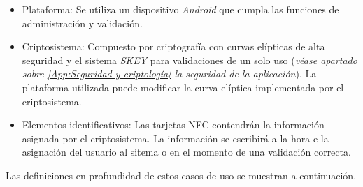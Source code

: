\documentclass[../PFC.tex]{subfiles}
\begin{document}
\begin{itemize}
\item{Plataforma: Se utiliza un dispositivo \textit{Android} que cumpla las funciones de administración y validación.}
\item{Criptosistema: Compuesto por criptografía con curvas elípticas de alta seguridad y el sistema \textit{SKEY} para validaciones de un solo uso (\textit{véase apartado sobre \ref{App:Seguridad y criptología} la seguridad de la aplicación}). La plataforma utilizada puede modificar la curva elíptica implementada por el criptosistema.}
\item{Elementos identificativos: Las tarjetas NFC contendrán la información asignada por el criptosistema. La información se escribirá a la hora e la asignación del usuario al sitema o en el momento de una validación correcta.}
\end{itemize}

Las definiciones en profundidad de estos casos de uso se muestran a continuación.
\end{document}
